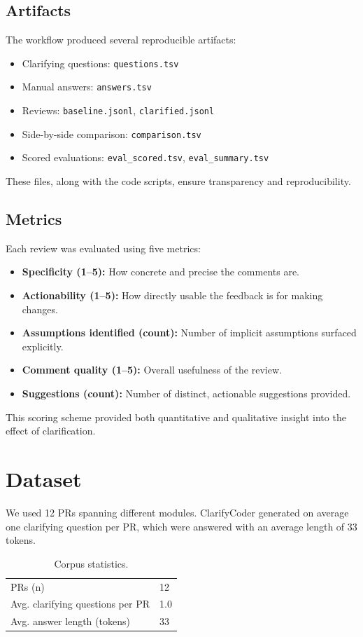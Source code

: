 \documentclass[conference]{IEEEtran}
\begin{document}
\subsection{Artifacts}
The workflow produced several reproducible artifacts:
\begin{itemize}[leftmargin=*]
    \item Clarifying questions: \texttt{questions.tsv}
    \item Manual answers: \texttt{answers.tsv}
    \item Reviews: \texttt{baseline.jsonl}, \texttt{clarified.jsonl}
    \item Side-by-side comparison: \texttt{comparison.tsv}
    \item Scored evaluations: \texttt{eval\_scored.tsv}, \texttt{eval\_summary.tsv}
\end{itemize}
These files, along with the code scripts, ensure transparency and reproducibility.

\subsection{Metrics}
Each review was evaluated using five metrics:
\begin{itemize}[leftmargin=*]
    \item \textbf{Specificity (1--5):} How concrete and precise the comments are.
    \item \textbf{Actionability (1--5):} How directly usable the feedback is for making changes.
    \item \textbf{Assumptions identified (count):} Number of implicit assumptions surfaced explicitly.
    \item \textbf{Comment quality (1--5):} Overall usefulness of the review.
    \item \textbf{Suggestions (count):} Number of distinct, actionable suggestions provided.
\end{itemize}
This scoring scheme provided both quantitative and qualitative insight into the effect of clarification.


\section{Dataset}
We used 12 PRs spanning different modules. ClarifyCoder generated on average one clarifying question per PR, which were answered with an average length of 33 tokens.

\begin{table}[h]
\centering
\caption{Corpus statistics.}
\begin{tabular}{ll}
\toprule
PRs (n) & 12 \\
Avg. clarifying questions per PR & 1.0 \\
Avg. answer length (tokens) & 33 \\
\bottomrule
\end{tabular}
\end{table}
\end{document}

